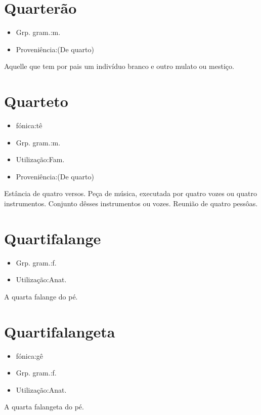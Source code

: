 \section{Quarterão}
\begin{itemize}
\item {Grp. gram.:m.}
\end{itemize}
\begin{itemize}
\item {Proveniência:(De \textunderscore quarto\textunderscore )}
\end{itemize}
Aquelle que tem por pais um indivíduo branco e outro mulato ou mestiço.
\section{Quarteto}
\begin{itemize}
\item {fónica:tê}
\end{itemize}
\begin{itemize}
\item {Grp. gram.:m.}
\end{itemize}
\begin{itemize}
\item {Utilização:Fam.}
\end{itemize}
\begin{itemize}
\item {Proveniência:(De \textunderscore quarto\textunderscore )}
\end{itemize}
Estância de quatro versos.
Peça de música, executada por quatro vozes ou quatro instrumentos.
Conjunto dêsses instrumentos ou vozes.
Reunião de quatro pessôas.
\section{Quartifalange}
\begin{itemize}
\item {Grp. gram.:f.}
\end{itemize}
\begin{itemize}
\item {Utilização:Anat.}
\end{itemize}
A quarta falange do pé.
\section{Quartifalangeta}
\begin{itemize}
\item {fónica:gê}
\end{itemize}
\begin{itemize}
\item {Grp. gram.:f.}
\end{itemize}
\begin{itemize}
\item {Utilização:Anat.}
\end{itemize}
A quarta falangeta do pé.
